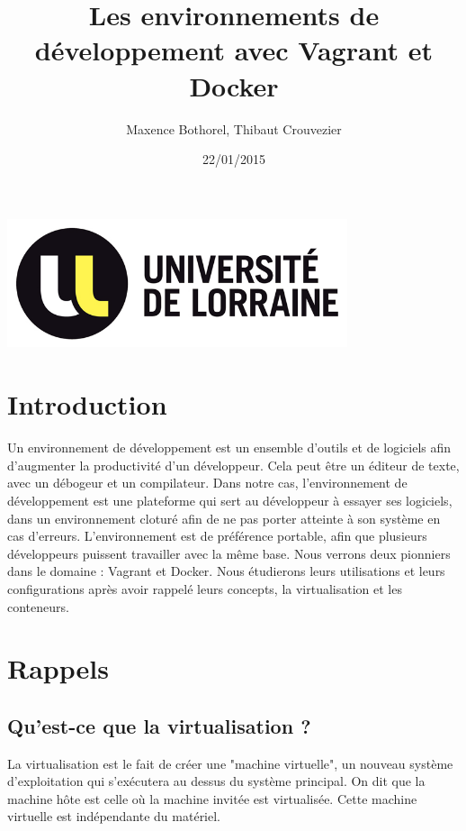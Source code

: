 \documentclass[12pt,a4paper]{article}
\title{Les environnements de développement avec Vagrant et Docker}
\author{Maxence Bothorel, Thibaut Crouvezier}
\date{22/01/2015}
\begin{document}
\maketitle{}

\begin{center}
  \includegraphics[width=10cm]{images_rapport/univ_logo.jpg}
\end{center}

\newpage{}

\tableofcontents{}

\newpage{}

\section{Introduction}
Un environnement de développement est un ensemble d'outils et de logiciels afin d'augmenter la productivité d'un développeur. Cela peut être un éditeur de texte, avec un débogeur et un compilateur. Dans notre cas, l'environnement de développement est une plateforme qui sert au développeur à essayer ses logiciels, dans un environnement cloturé afin de ne pas porter atteinte à son système en cas d'erreurs. L'environnement est de préférence portable, afin que plusieurs développeurs puissent travailler avec la même base. Nous verrons deux pionniers dans le domaine : Vagrant et Docker. Nous étudierons leurs utilisations et leurs configurations après avoir rappelé leurs concepts, la virtualisation et les conteneurs. 

\section{Rappels}

\subsection{Qu'est-ce que la virtualisation ?}

La virtualisation est le fait de créer une "machine virtuelle", un nouveau système d'exploitation qui s'exécutera au dessus du système principal. On dit que la machine hôte est celle où la machine invitée est virtualisée. Cette machine virtuelle est indépendante du matériel.
\end{document}
